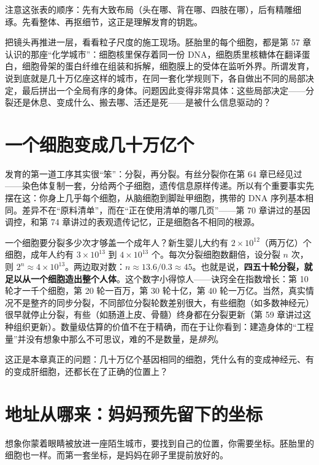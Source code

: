 注意这张表的顺序：先有大致布局（头在哪、背在哪、四肢在哪），后有精雕细琢。先看整体、再抠细节，这正是理解发育的钥匙。

把镜头再推进一层，看看粒子尺度的施工现场。胚胎里的每个细胞，都是第 57 章认识的那座“化学城市”：细胞核里保存着同一份 DNA，细胞质里核糖体在翻译蛋白，细胞骨架的蛋白纤维在组装和拆解，细胞膜上的受体在监听外界。所谓发育，说到底就是几十万亿座这样的城市，在同一套化学规则下，各自做出不同的局部决定，最后拼出一个全局有序的身体。问题因此变得非常具体：这些局部决定——分裂还是休息、变成什么、搬去哪、活还是死——是被什么信息驱动的？

\section{一个细胞变成几十万亿个}

发育的第一道工序其实很“笨”：分裂，再分裂。有丝分裂你在第 64 章已经见过——染色体复制一套，分给两个子细胞，遗传信息原样传递。所以有个重要事实先摆在这：你身上几乎每个细胞，从脑细胞到脚趾甲细胞，携带的 DNA 序列基本相同。差异不在“原料清单”，而在“正在使用清单的哪几页”——第 70 章讲过的基因调控，和第 74 章讲过的表观遗传记忆，正是细胞各不相同的根源。

\begin{qiaoliang}
一个细胞要分裂多少次才够盖一个成年人？新生婴儿大约有 $2\times 10^{12}$（两万亿）个细胞，成年人约有 $3\times 10^{13}$ 到 $4\times 10^{13}$ 个。每次分裂细胞数翻倍，设分裂 $n$ 次，则 $2^n \approx 4\times 10^{13}$。两边取对数：$n \approx 13.6/0.3 \approx 45$。也就是说，\textbf{四五十轮分裂，就足以从一个细胞造出整个人体}。这个数字小得惊人——诀窍全在指数增长：第 10 轮才一千个细胞，第 20 轮一百万，第 30 轮十亿，第 40 轮一万亿。当然，真实情况不是整齐的同步分裂，不同部位分裂轮数差别很大，有些细胞（如多数神经元）很早就停止分裂，有些（如肠道上皮、骨髓）终身都在分裂更新（第 59 章讲过这种组织更新）。数量级估算的价值不在于精确，而在于让你看到：建造身体的“工程量”并没有想象中那么不可思议，难的不是数量，是\emph{排列}。
\end{qiaoliang}

这正是本章真正的问题：几十万亿个基因相同的细胞，凭什么有的变成神经元、有的变成肝细胞，还都长在了正确的位置上？

\section{地址从哪来：妈妈预先留下的坐标}

想象你蒙着眼睛被放进一座陌生城市，要找到自己的位置，你需要坐标。胚胎里的细胞也一样。而第一套坐标，是妈妈在卵子里提前放好的。


